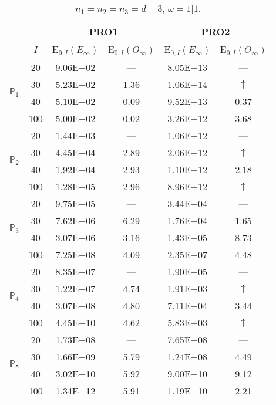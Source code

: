 \begin{table}[H]
\caption{$n_1=n_2=n_3=d+3$, $\omega=1|1$.}
\setlength{\tabcolsep}{5pt}
\centering
\begin{tabular}{@{}l c c c c c@{}}
\toprule
 &  & \multicolumn{2}{c}{PRO1} & \multicolumn{2}{c}{PRO2}\\
\midrule
 & $I$ & E$_{0,I}(E_{\infty})$ & E$_{0,I}(O_{\infty})$ & E$_{0,I}(E_{\infty})$ & E$_{0,I}(O_{\infty})$\\
\midrule
\multirow{4}{*}{$\mathbb{P}_{1}$}
 & 20 & 9.06E$-$02 & --- & 8.05E$+$13 & ---\\
 & 30 & 5.23E$-$02 & 1.36 & 1.06E$+$14 & $\uparrow$ \\
 & 40 & 5.10E$-$02 & 0.09 & 9.52E$+$13 & 0.37 \\
 & 100 & 5.00E$-$02 & 0.02 & 3.26E$+$12 & 3.68 \\
\midrule
\multirow{4}{*}{$\mathbb{P}_{2}$}
 & 20 & 1.44E$-$03 & --- & 1.06E$+$12 & ---\\
 & 30 & 4.45E$-$04 & 2.89 & 2.06E$+$12 & $\uparrow$ \\
 & 40 & 1.92E$-$04 & 2.93 & 1.10E$+$12 & 2.18 \\
 & 100 & 1.28E$-$05 & 2.96 & 8.96E$+$12 & $\uparrow$ \\
\midrule
\multirow{4}{*}{$\mathbb{P}_{3}$}
 & 20 & 9.75E$-$05 & --- & 3.44E$-$04 & ---\\
 & 30 & 7.62E$-$06 & 6.29 & 1.76E$-$04 & 1.65 \\
 & 40 & 3.07E$-$06 & 3.16 & 1.43E$-$05 & 8.73 \\
 & 100 & 7.25E$-$08 & 4.09 & 2.35E$-$07 & 4.48 \\
\midrule
\multirow{4}{*}{$\mathbb{P}_{4}$}
 & 20 & 8.35E$-$07 & --- & 1.90E$-$05 & ---\\
 & 30 & 1.22E$-$07 & 4.74 & 1.91E$-$03 & $\uparrow$ \\
 & 40 & 3.07E$-$08 & 4.80 & 7.11E$-$04 & 3.44 \\
 & 100 & 4.45E$-$10 & 4.62 & 5.83E$+$03 & $\uparrow$ \\
\midrule
\multirow{4}{*}{$\mathbb{P}_{5}$}
 & 20 & 1.73E$-$08 & --- & 7.65E$-$08 & ---\\
 & 30 & 1.66E$-$09 & 5.79 & 1.24E$-$08 & 4.49 \\
 & 40 & 3.02E$-$10 & 5.92 & 9.00E$-$10 & 9.12 \\
 & 100 & 1.34E$-$12 & 5.91 & 1.19E$-$10 & 2.21 \\
\bottomrule
\end{tabular}
\label{Table:PRO:Rodrigo:Test13}
\end{table}
